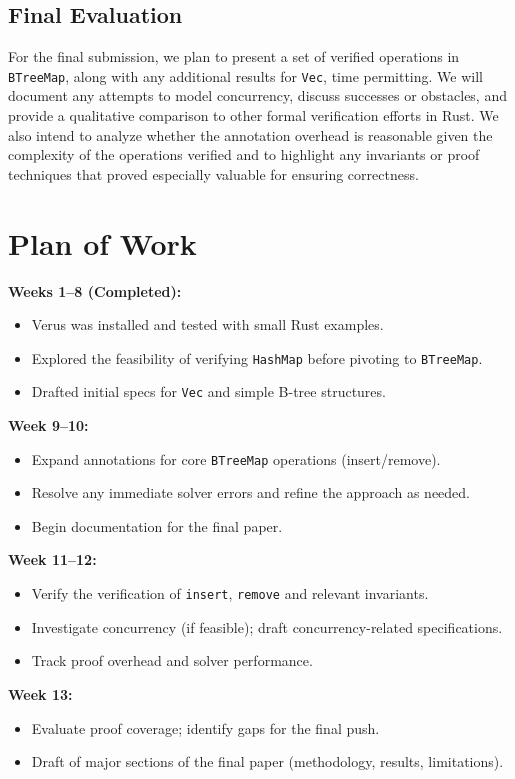 \documentclass[conference]{IEEEtran}
\begin{document}
\subsection{Final Evaluation}
For the final submission, we plan to present a set of verified operations in \texttt{BTreeMap}, along with any additional results for \texttt{Vec}, time permitting. We will document any attempts to model concurrency, discuss successes or obstacles, and provide a qualitative comparison to other formal verification efforts in Rust. We also intend to analyze whether the annotation overhead is reasonable given the complexity of the operations verified and to highlight any invariants or proof techniques that proved especially valuable for ensuring correctness.


\section{Plan of Work}
\noindent\textbf{Weeks 1--8 (Completed):}
\begin{itemize}
\item Verus was installed and tested with small Rust examples.
\item Explored the feasibility of verifying \texttt{HashMap} before pivoting to \texttt{BTreeMap}.
\item Drafted initial specs for \texttt{Vec} and simple B-tree structures.
\end{itemize}

\noindent\textbf{Week 9--10:}
\begin{itemize}
\item Expand annotations for core \texttt{BTreeMap} operations (insert/remove).
\item Resolve any immediate solver errors and refine the approach as needed.
\item Begin documentation for the final paper.
\end{itemize}

\noindent\textbf{Week 11--12:}
\begin{itemize}
\item Verify the verification of \texttt{insert}, \texttt{remove} and relevant invariants.
\item Investigate concurrency (if feasible); draft concurrency-related specifications.
\item Track proof overhead and solver performance.
\end{itemize}

\noindent\textbf{Week 13:}
\begin{itemize}
\item Evaluate proof coverage; identify gaps for the final push.
\item Draft of major sections of the final paper (methodology, results, limitations).
\end{itemize}
\end{document}
